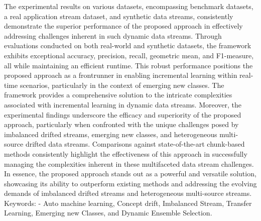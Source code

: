 \begin{abstracts}
    The experimental results on various datasets, encompassing benchmark datasets, a real application stream dataset, and synthetic data streams, consistently demonstrate the superior performance of the proposed approach in effectively addressing challenges inherent in such dynamic data streams. Through evaluations conducted on both real-world and synthetic datasets, the framework exhibits exceptional accuracy, precision, recall, geometric mean, and F1-measure, all while maintaining an efficient runtime.
    This robust performance positions the proposed approach as a frontrunner in enabling incremental learning within real-time scenarios, particularly in the context of emerging new classes. The framework provides a comprehensive solution to the intricate complexities associated with incremental learning in dynamic data streams. Moreover, the experimental findings underscore the efficacy and superiority of the proposed approach, particularly when confronted with the unique challenges posed by imbalanced drifted streams, emerging new classes, and heterogeneous multi-source drifted data streams.
    Comparisons against state-of-the-art chunk-based methods consistently highlight the effectiveness of this approach in successfully managing the complexities inherent in these multifaceted data stream challenges. In essence, the proposed approach stands out as a powerful and versatile solution, showcasing its ability to outperform existing methods and addressing the evolving demands of imbalanced drifted streams and heterogeneous multi-source streams.
    Keywords: - Auto machine learning, Concept drift, Imbalanced Stream, Transfer Learning, Emerging new Classes, and Dynamic Ensemble Selection.
    






\end{abstracts}




%
%



